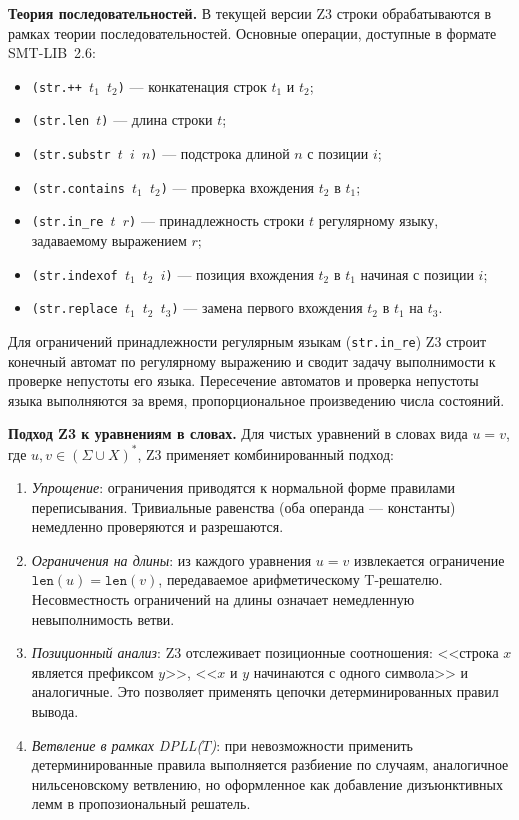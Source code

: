 \documentclass[14pt, russian]{scrartcl}
\begin{document}
\medskip\noindent\textbf{Теория последовательностей.}
В текущей версии Z3 строки обрабатываются в рамках теории последовательностей.
Основные операции, доступные в формате SMT-LIB~2.6:

\begin{itemize}
\item \texttt{(str.++ $t_1$ $t_2$)} --- конкатенация строк $t_1$ и $t_2$;
\item \texttt{(str.len $t$)} --- длина строки $t$;
\item \texttt{(str.substr $t$ $i$ $n$)} --- подстрока длиной $n$ с позиции $i$;
\item \texttt{(str.contains $t_1$ $t_2$)} --- проверка вхождения $t_2$ в $t_1$;
\item \texttt{(str.in\_re $t$ $r$)} --- принадлежность строки $t$ регулярному
  языку, задаваемому выражением $r$;
\item \texttt{(str.indexof $t_1$ $t_2$ $i$)} --- позиция вхождения $t_2$ в $t_1$
  начиная с позиции $i$;
\item \texttt{(str.replace $t_1$ $t_2$ $t_3$)} --- замена первого вхождения
  $t_2$ в $t_1$ на $t_3$.
\end{itemize}

Для ограничений принадлежности регулярным языкам (\texttt{str.in\_re}) Z3
строит конечный автомат по регулярному выражению и сводит задачу выполнимости
к проверке непустоты его языка. Пересечение автоматов и проверка непустоты
языка выполняются за время, пропорциональное произведению числа состояний.

\medskip\noindent\textbf{Подход Z3 к уравнениям в словах.}
Для чистых уравнений в словах вида $u = v$, где $u, v \in (\Sigma \cup X)^*$,
Z3 применяет комбинированный подход:

\begin{enumerate}
\item \emph{Упрощение}: ограничения приводятся к нормальной форме правилами
  переписывания. Тривиальные равенства (оба операнда --- константы) немедленно
  проверяются и разрешаются.
\item \emph{Ограничения на длины}: из каждого уравнения $u = v$ извлекается
  ограничение $\texttt{len}(u) = \texttt{len}(v)$, передаваемое арифметическому
  T-решателю. Несовместность ограничений на длины означает немедленную
  невыполнимость ветви.
\item \emph{Позиционный анализ}: Z3 отслеживает позиционные соотношения:
  <<строка $x$ является префиксом $y$>>, <<$x$ и $y$ начинаются с одного символа>>
  и аналогичные. Это позволяет применять цепочки детерминированных правил вывода.
\item \emph{Ветвление в рамках DPLL($T$)}: при невозможности применить
  детерминированные правила выполняется разбиение по случаям, аналогичное
  нильсеновскому ветвлению, но оформленное как добавление дизъюнктивных лемм
  в пропозиональный решатель.
\end{enumerate}
\end{document}
